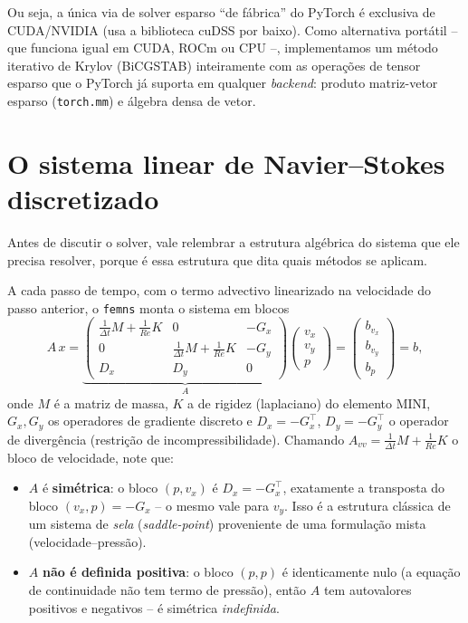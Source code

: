 \documentclass[11pt,a4paper]{article}
\newcommand{\vx}{v_x}
\newcommand{\vy}{v_y}
\begin{document}
Ou seja, a única via de solver esparso ``de fábrica'' do PyTorch é
exclusiva de CUDA/NVIDIA (usa a biblioteca cuDSS por baixo). Como
alternativa portátil -- que funciona igual em CUDA, ROCm ou CPU --,
implementamos um método iterativo de Krylov (BiCGSTAB) inteiramente
com as operações de tensor esparso que o PyTorch já suporta em
qualquer \emph{backend}: produto matriz-vetor esparso
(\texttt{torch.mm}) e álgebra densa de vetor.

\section{O sistema linear de Navier--Stokes discretizado}
\label{sec:sistema}

Antes de discutir o solver, vale relembrar a estrutura algébrica do
sistema que ele precisa resolver, porque é essa estrutura que dita
quais métodos se aplicam.

A cada passo de tempo, com o termo advectivo linearizado na
velocidade do passo anterior, o \texttt{femns} monta o sistema em
blocos
\begin{equation}
  \label{eq:sistema-original}
  A\,x =
  \underbrace{\begin{pmatrix}
    \tfrac{1}{\Delta t}M + \tfrac{1}{Re}K & 0 & -G_x \\[2pt]
    0 & \tfrac{1}{\Delta t}M + \tfrac{1}{Re}K & -G_y \\[2pt]
    D_x & D_y & 0
  \end{pmatrix}}_{A}
  \begin{pmatrix} \vx \\ \vy \\ p \end{pmatrix}
  =
  \begin{pmatrix} b_{\vx} \\ b_{\vy} \\ b_p \end{pmatrix} = b,
\end{equation}
onde $M$ é a matriz de massa, $K$ a de rigidez (laplaciano) do
elemento MINI, $G_x,G_y$ os operadores de gradiente discreto e
$D_x=-G_x^\top$, $D_y=-G_y^\top$ o operador de divergência (restrição
de incompressibilidade). Chamando $A_{vv} = \tfrac{1}{\Delta t}M +
\tfrac{1}{Re}K$ o bloco de velocidade, note que:

\begin{itemize}
  \item $A$ é \textbf{simétrica}: o bloco $(p,\vx)$ é $D_x = -G_x^\top$,
    exatamente a transposta do bloco $(\vx,p) = -G_x$ -- o mesmo vale
    para $\vy$. Isso é a estrutura clássica de um sistema de
    \emph{sela} (\emph{saddle-point}) proveniente de uma formulação
    mista (velocidade--pressão).
  \item $A$ \textbf{não é definida positiva}: o bloco $(p,p)$ é
    identicamente nulo (a equação de continuidade não tem termo de
    pressão), então $A$ tem autovalores positivos e negativos --  é
    simétrica \emph{indefinida}.
\end{itemize}
\end{document}
